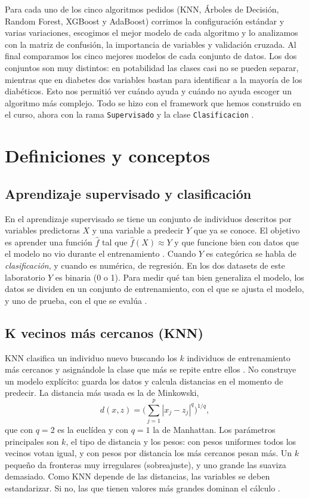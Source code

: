 \documentclass[11pt,a4paper]{article}
\let\citepOriginal\citep
\renewcommand*{\citep}[1]{\textbf{\citepOriginal{#1}}}%
\begin{document}
Para cada uno de los cinco algoritmos pedidos (KNN, Árboles de Decisión, Random Forest, XGBoost y AdaBoost) corrimos la configuración estándar y varias variaciones, escogimos el mejor modelo de cada algoritmo y lo analizamos con la matriz de confusión, la importancia de variables y validación cruzada. Al final comparamos los cinco mejores modelos de cada conjunto de datos. Los dos conjuntos son muy distintos: en potabilidad las clases casi no se pueden separar, mientras que en diabetes dos variables bastan para identificar a la mayoría de los diabéticos. Esto nos permitió ver cuándo ayuda y cuándo no ayuda escoger un algoritmo más complejo. Todo se hizo con el framework que hemos construido en el curso, ahora con la rama \texttt{Supervisado} y la clase \texttt{Clasificacion} \citep{pedregosa2011}.

\section{Definiciones y conceptos}

\subsection{Aprendizaje supervisado y clasificación}
En el aprendizaje supervisado se tiene un conjunto de individuos descritos por variables predictoras $X$ y una variable a predecir $Y$ que ya se conoce. El objetivo es aprender una función $\hat f$ tal que $\hat f(X)\approx Y$ y que funcione bien con datos que el modelo no vio durante el entrenamiento \citep{james2013}. Cuando $Y$ es categórica se habla de \textit{clasificación}, y cuando es numérica, de regresión. En los dos datasets de este laboratorio $Y$ es binaria (0 o 1). Para medir qué tan bien generaliza el modelo, los datos se dividen en un conjunto de entrenamiento, con el que se ajusta el modelo, y uno de prueba, con el que se evalúa \citep{hastie2009}.

\subsection{K vecinos más cercanos (KNN)}
KNN clasifica un individuo nuevo buscando los $k$ individuos de entrenamiento más cercanos y asignándole la clase que más se repite entre ellos \citep{cover1967}. No construye un modelo explícito: guarda los datos y calcula distancias en el momento de predecir. La distancia más usada es la de Minkowski,
\[
d(x,z)=\Big(\sum_{j=1}^{p}|x_j-z_j|^{q}\Big)^{1/q},
\]
que con $q=2$ es la euclídea y con $q=1$ la de Manhattan. Los parámetros principales son $k$, el tipo de distancia y los pesos: con pesos uniformes todos los vecinos votan igual, y con pesos por distancia los más cercanos pesan más. Un $k$ pequeño da fronteras muy irregulares (sobreajuste), y uno grande las suaviza demasiado. Como KNN depende de las distancias, las variables se deben estandarizar. Si no, las que tienen valores más grandes dominan el cálculo \citep{james2013}.
\end{document}
